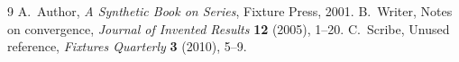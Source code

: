 \begin{thebibliography}{9}
 A.~Author, \emph{A Synthetic Book on Series}, Fixture Press, 2001.
 B.~Writer, Notes on convergence, \emph{Journal of Invented Results} \textbf{12} (2005), 1--20.
 C.~Scribe, Unused reference, \emph{Fixtures Quarterly} \textbf{3} (2010), 5--9.
\end{thebibliography}
